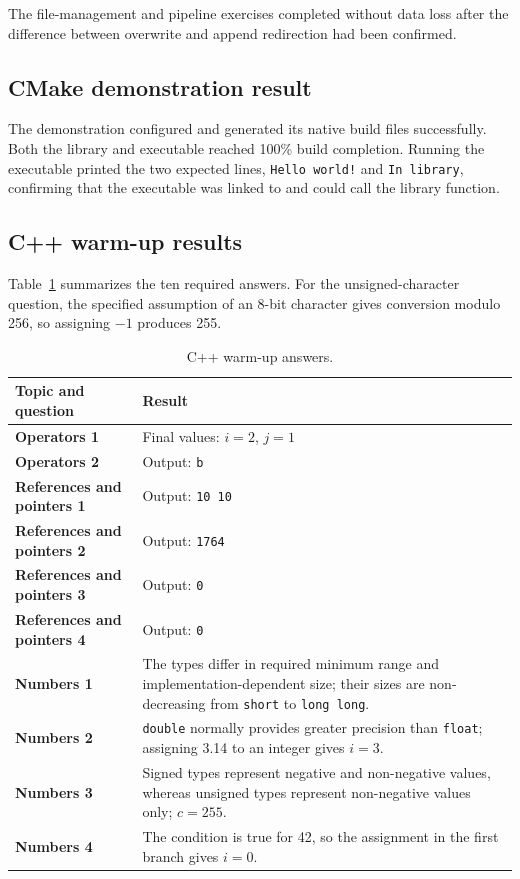 \documentclass[11pt,a4paper]{article}
\begin{document}
The file-management and pipeline exercises completed without data loss after the difference between overwrite and append redirection had been confirmed.

\subsection{CMake demonstration result}

The demonstration configured and generated its native build files successfully. Both the library and executable reached 100\% build completion. Running the executable printed the two expected lines, \texttt{Hello world!} and \texttt{In library}, confirming that the executable was linked to and could call the library function.

\clearpage
\subsection{C++ warm-up results}

Table~\ref{tab:warmup} summarizes the ten required answers. For the unsigned-character question, the specified assumption of an 8-bit character gives conversion modulo 256, so assigning $-1$ produces 255.

\begin{table}[H]
  \centering
  \footnotesize
  \caption{C++ warm-up answers.}
  \label{tab:warmup}
  \begin{tabularx}{\textwidth}{>{\bfseries}p{}X}
    \toprule
    Topic and question & Result \\
    \midrule
    Operators 1 & Final values: $i=2$, $j=1$ \\
    Operators 2 & Output: \texttt{b} \\
    References and pointers 1 & Output: \texttt{10 10} \\
    References and pointers 2 & Output: \texttt{1764} \\
    References and pointers 3 & Output: \texttt{0} \\
    References and pointers 4 & Output: \texttt{0} \\
    Numbers 1 & The types differ in required minimum range and implementation-dependent size; their sizes are non-decreasing from \texttt{short} to \texttt{long long}. \\
    Numbers 2 & \texttt{double} normally provides greater precision than \texttt{float}; assigning 3.14 to an integer gives $i=3$. \\
    Numbers 3 & Signed types represent negative and non-negative values, whereas unsigned types represent non-negative values only; $c=255$. \\
    Numbers 4 & The condition is true for 42, so the assignment in the first branch gives $i=0$. \\
    \bottomrule
  \end{tabularx}
\end{table}
\end{document}
